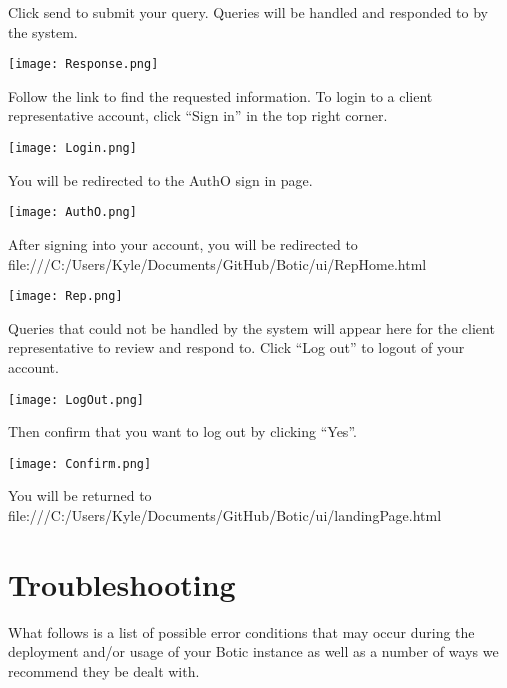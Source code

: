 \documentclass[11pt]{article}
\begin{document}
\begin{flushleft}
	Click send to submit your query. Queries will be handled and responded to by the system.
\end{flushleft}
\texttt{[image: Response.png]}

\begin{flushleft}
	Follow the link to find the requested information.
	To login to a client representative account, click “Sign in” in the top right corner.
\end{flushleft}
\texttt{[image: Login.png]}

\begin{flushleft}
	You will be redirected to the AuthO sign in page.
\end{flushleft}
\texttt{[image: AuthO.png]}

\begin{flushleft}
	After signing into your account, you will be redirected to file:///C:/Users/Kyle/Documents/GitHub/Botic/ui/RepHome.html
\end{flushleft}
\texttt{[image: Rep.png]}

\begin{flushleft}
	Queries that could not be handled by the system will appear here for the client representative to review and respond to.
	Click “Log out” to logout of your account.
\end{flushleft}
\texttt{[image: LogOut.png]}

\begin{flushleft}
	Then confirm that you want to log out by clicking “Yes”.
\end{flushleft}
\texttt{[image: Confirm.png]}

\begin{flushleft}
You will be returned to file:///C:/Users/Kyle/Documents/GitHub/Botic/ui/landingPage.html
\end{flushleft}

\section{Troubleshooting}
What follows is a list of possible error conditions that may occur during the deployment and/or usage of your Botic instance as well as a number of ways we recommend they be dealt with.
\end{document}
